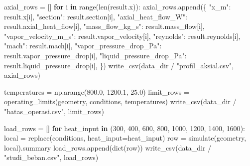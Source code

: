 \documentclass[
  12pt,
  12pt,a4paper,oneside]{report}
\newenvironment{Shaded}{}{}
\newcommand{\BuiltInTok}[1]{\textcolor[rgb]{0.00,0.50,0.00}{#1}}
\newcommand{\ControlFlowTok}[1]{\textcolor[rgb]{0.00,0.44,0.13}{\textbf{#1}}}
\newcommand{\DecValTok}[1]{\textcolor[rgb]{0.25,0.63,0.44}{#1}}
\newcommand{\FloatTok}[1]{\textcolor[rgb]{0.25,0.63,0.44}{#1}}
\newcommand{\KeywordTok}[1]{\textcolor[rgb]{0.00,0.44,0.13}{\textbf{#1}}}
\newcommand{\NormalTok}[1]{#1}
\newcommand{\OperatorTok}[1]{\textcolor[rgb]{0.40,0.40,0.40}{#1}}
\newcommand{\StringTok}[1]{\textcolor[rgb]{0.25,0.44,0.63}{#1}}
\begin{document}
\begin{Shaded}
\begin{Highlighting}[]
\NormalTok{    axial\_rows }\OperatorTok{=}\NormalTok{ []}
    \ControlFlowTok{for}\NormalTok{ i }\KeywordTok{in} \BuiltInTok{range}\NormalTok{(}\BuiltInTok{len}\NormalTok{(result.x)):}
\NormalTok{        axial\_rows.append(\{}
            \StringTok{"x\_m"}\NormalTok{: result.x[i], }\StringTok{"section"}\NormalTok{: result.section[i],}
            \StringTok{"axial\_heat\_flow\_W"}\NormalTok{: result.axial\_heat\_flow[i],}
            \StringTok{"mass\_flow\_kg\_s"}\NormalTok{: result.mass\_flow[i],}
            \StringTok{"vapor\_velocity\_m\_s"}\NormalTok{: result.vapor\_velocity[i],}
            \StringTok{"reynolds"}\NormalTok{: result.reynolds[i], }\StringTok{"mach"}\NormalTok{: result.mach[i],}
            \StringTok{"vapor\_pressure\_drop\_Pa"}\NormalTok{: result.vapor\_pressure\_drop[i],}
            \StringTok{"liquid\_pressure\_drop\_Pa"}\NormalTok{: result.liquid\_pressure\_drop[i],}
\NormalTok{        \})}
\NormalTok{    write\_csv(data\_dir }\OperatorTok{/} \StringTok{"profil\_aksial.csv"}\NormalTok{, axial\_rows)}

\NormalTok{    temperatures }\OperatorTok{=}\NormalTok{ np.arange(}\FloatTok{800.0}\NormalTok{, }\FloatTok{1200.1}\NormalTok{, }\FloatTok{25.0}\NormalTok{)}
\NormalTok{    limit\_rows }\OperatorTok{=}\NormalTok{ operating\_limits(geometry, conditions, temperatures)}
\NormalTok{    write\_csv(data\_dir }\OperatorTok{/} \StringTok{"batas\_operasi.csv"}\NormalTok{, limit\_rows)}

\NormalTok{    load\_rows }\OperatorTok{=}\NormalTok{ []}
    \ControlFlowTok{for}\NormalTok{ heat\_input }\KeywordTok{in}\NormalTok{ (}\DecValTok{300}\NormalTok{, }\DecValTok{400}\NormalTok{, }\DecValTok{600}\NormalTok{, }\DecValTok{800}\NormalTok{, }\DecValTok{1000}\NormalTok{, }\DecValTok{1200}\NormalTok{, }\DecValTok{1400}\NormalTok{, }\DecValTok{1600}\NormalTok{):}
\NormalTok{        local }\OperatorTok{=}\NormalTok{ replace(conditions, heat\_input}\OperatorTok{=}\NormalTok{heat\_input)}
\NormalTok{        row }\OperatorTok{=}\NormalTok{ simulate(geometry, local).summary}
\NormalTok{        load\_rows.append(}\BuiltInTok{dict}\NormalTok{(row))}
\NormalTok{    write\_csv(data\_dir }\OperatorTok{/} \StringTok{"studi\_beban.csv"}\NormalTok{, load\_rows)}


\end{Highlighting}
\end{Shaded}
\end{document}

